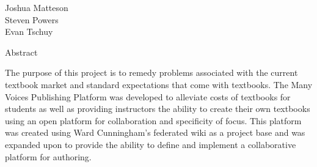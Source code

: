 \documentclass{article}
\begin{document}
    \setlength{\parindent}{0pt}
    \setlength{\parskip}{0pt}
\begingroup\flushleft
  Joshua Matteson\\
  Steven Powers\\
  Evan Tschuy
\endgroup

\vspace{1pc}
\centerline{\sc \large Abstract}
\vspace{2pc}

\hspace{10mm}The purpose of this project is to remedy problems associated with the current textbook market and standard expectations that come with textbooks. The Many Voices Publishing Platform was developed to alleviate costs of textbooks for students as well as providing instructors the ability to create their own textbooks using an open platform for collaboration and specificity of focus. This platform was created using Ward Cunningham’s federated wiki as a project base and was expanded upon to provide the ability to define and implement a collaborative platform for authoring.
\end{document}
